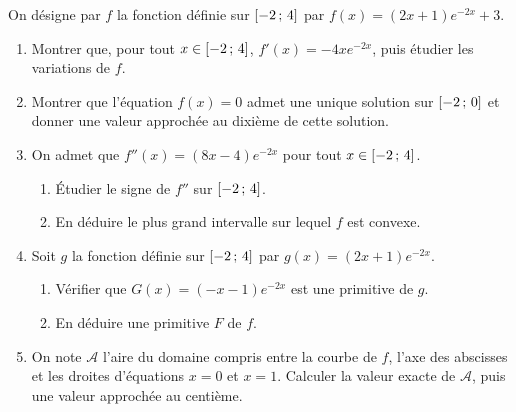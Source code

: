 \begin{annales}
On désigne par $f$ la fonction définie sur $\left[-2\,;\,4\right]$ par
$f(x) = (2x+1)e^{-2x}+3$.
\begin{enumerate}[label=\textbf{\arabic*.}, leftmargin=*, itemsep=0.2em]
  \item Montrer que, pour tout $x \in \left[-2\,;\,4\right]$,
        $f'(x) = -4xe^{-2x}$, puis étudier les variations de $f$.
  \item Montrer que l'équation $f(x) = 0$ admet une unique solution sur
        $\left[-2\,;\,0\right]$ et donner une valeur approchée au dixième de
        cette solution.
  \item On admet que $f''(x) = (8x-4)e^{-2x}$ pour tout $x \in
        \left[-2\,;\,4\right]$.
        \begin{enumerate}[label=\textbf{\alph*)}, leftmargin=1.2em]
          \item Étudier le signe de $f''$ sur $\left[-2\,;\,4\right]$.
          \item En déduire le plus grand intervalle sur lequel $f$ est
                convexe.
        \end{enumerate}
  \item Soit $g$ la fonction définie sur $\left[-2\,;\,4\right]$ par
        $g(x) = (2x+1)e^{-2x}$.
        \begin{enumerate}[label=\textbf{\alph*)}, leftmargin=1.2em]
          \item Vérifier que $G(x) = (-x-1)e^{-2x}$ est une primitive de $g$.
          \item En déduire une primitive $F$ de $f$.
        \end{enumerate}
  \item On note $\mathcal{A}$ l'aire du domaine compris entre la courbe de
        $f$, l'axe des abscisses et les droites d'équations $x = 0$ et
        $x = 1$. Calculer la valeur exacte de $\mathcal{A}$, puis une valeur
        approchée au centième.
\end{enumerate}
\end{annales}

